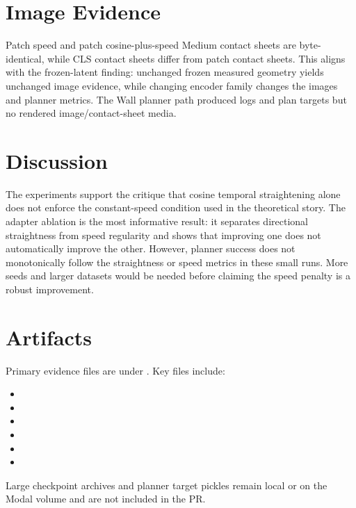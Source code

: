 \documentclass[11pt]{article}
\begin{document}
\section{Image Evidence}

Patch speed and patch cosine-plus-speed Medium contact sheets are byte-identical, while CLS contact sheets differ from patch contact sheets. This aligns with the frozen-latent finding: unchanged frozen measured geometry yields unchanged image evidence, while changing encoder family changes the images and planner metrics. The Wall planner path produced logs and plan targets but no rendered image/contact-sheet media.

\section{Discussion}

The experiments support the critique that cosine temporal straightening alone does not enforce the constant-speed condition used in the theoretical story. The adapter ablation is the most informative result: it separates directional straightness from speed regularity and shows that improving one does not automatically improve the other. However, planner success does not monotonically follow the straightness or speed metrics in these small runs. More seeds and larger datasets would be needed before claiming the speed penalty is a robust improvement.

\section{Artifacts}

Primary evidence files are under . Key files include:
\begin{itemize}
  \item {}
  \item {}
  \item {}
  \item {}
  \item {}
  \item {}
\end{itemize}
Large checkpoint archives and planner target pickles remain local or on the Modal volume and are not included in the PR.
\end{document}
